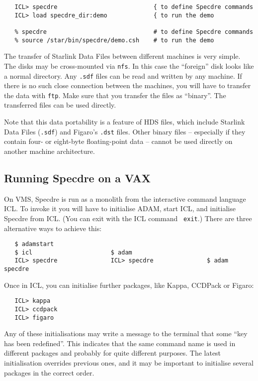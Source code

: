 \begin{verbatim}
   ICL> specdre                           { to define Specdre commands
   ICL> load specdre_dir:demo             { to run the demo

   % specdre                              # to define Specdre commands
   % source /star/bin/specdre/demo.csh    # to run the demo
\end{verbatim}

The transfer of Starlink Data Files between different machines is very simple.
The disks may be cross-mounted via {\tt nfs}. In this case the ``foreign'' disk
looks like a normal directory. Any {\tt .sdf} files can be read and written by
any machine. If there is no such close connection between the machines, you
will have to transfer the data with {\tt ftp}. Make sure that you transfer the
files as ``binary''. The transferred files can be used directly.

Note that this data portability is a feature of HDS files, which include
Starlink Data Files ({\tt .sdf}) and Figaro's {\tt .dst} files. Other binary
files -- especially if they contain four- or eight-byte floating-point data --
cannot be used directly on another machine architecture.

\goodbreak
\subsection{Running Specdre on a VAX}

On VMS, Specdre is run as a monolith from the interactive command
language ICL.  To invoke it you will have to initialise ADAM, start ICL,
and initialise Specdre from ICL. (You can exit with the ICL command {\tt
exit}.) There are three alternative ways to achieve this:

\begin{verbatim}
   $ adamstart
   $ icl                      $ adam
   ICL> specdre               ICL> specdre               $ adam specdre
\end{verbatim}

Once in ICL, you can initialise further packages, like Kappa, CCDPack or
Figaro:

\begin{verbatim}
   ICL> kappa
   ICL> ccdpack
   ICL> figaro
\end{verbatim}

Any of these initialisations may write a message to the terminal that
some ``key has been redefined''. This indicates that the same command
name is used in different packages and probably for quite different
purposes. The latest initialisation overrides previous ones, and it may
be important to initialise several packages in the correct order.

